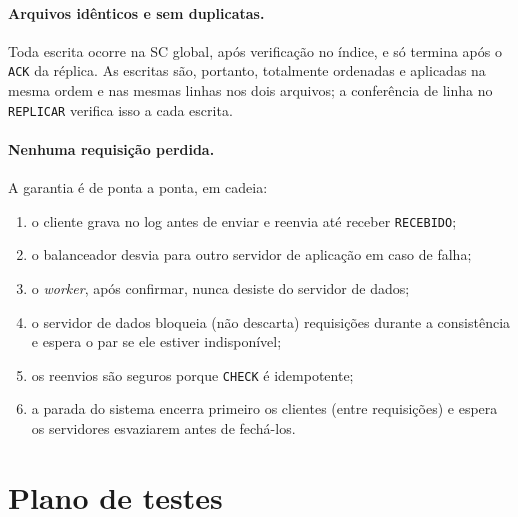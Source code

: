 \documentclass[11pt,a4paper]{article}
\newcommand{\msg}[1]{\texttt{#1}}
\begin{document}
\paragraph{Arquivos idênticos e sem duplicatas.}
Toda escrita ocorre na SC global, após verificação no índice, e só termina após o
\msg{ACK} da réplica. As escritas são, portanto, totalmente ordenadas e aplicadas na
mesma ordem e nas mesmas linhas nos dois arquivos; a conferência de linha no
\msg{REPLICAR} verifica isso a cada escrita.

\paragraph{Nenhuma requisição perdida.}
A garantia é de ponta a ponta, em cadeia:
\begin{enumerate}
  \item o cliente grava no log antes de enviar e reenvia até receber \msg{RECEBIDO};
  \item o balanceador desvia para outro servidor de aplicação em caso de falha;
  \item o \emph{worker}, após confirmar, nunca desiste do servidor de dados;
  \item o servidor de dados bloqueia (não descarta) requisições durante a
        consistência e espera o par se ele estiver indisponível;
  \item os reenvios são seguros porque \msg{CHECK} é idempotente;
  \item a parada do sistema encerra primeiro os clientes (entre requisições) e
        espera os servidores esvaziarem antes de fechá-los.
\end{enumerate}

\section{Plano de testes}
\label{sec:testes}
\end{document}
